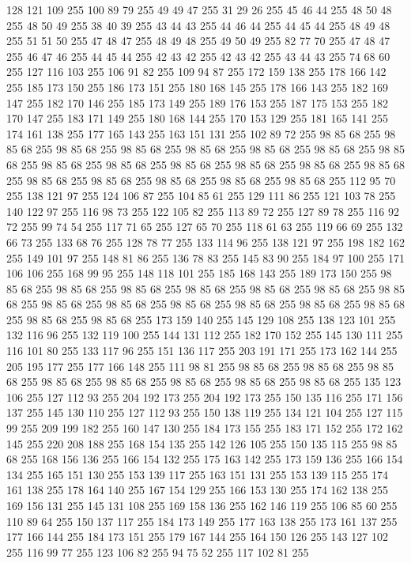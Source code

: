 128 121 109 255 100 89 79 255 49 49 47 255 31 29 26 255 45 46 44 255 48 50 48 255 48 50 49 255 38 40 39 255 43 44 43 255 44 46 44 255 44 45 44 255 48 49 48 255 51 51 50 255 47 48 47 255 48 49 48 255 49 50 49 255 82 77 70 255 47 48 47 255 46 47 46 255 44 45 44 255 42 43 42 255 42 43 42 255 43 44 43 255 74 68 60 255 127 116 103 255 106 91 82 255 109 94 87 255 172 159 138 255 178 166 142 255 185 173 150 255 186 173 151 255 180 168 145 255 178 166 143 255 182 169 147 255 182 170 146 255 185 173 149 255 189 176 153 255 187 175 153 255 182 170 147 255 183 171 149 255 180 168 144 255 170 153 129 255 181 165 141 255 174 161 138 255 177 165 143 255 163 151 131 255 102 89 72 255 98 85 68 255 98 85 68 255 98 85 68 255 98 85 68 255 98 85 68 255 98 85 68 255 98 85 68 255 98 85 68 255 98 85 68 255 98 85 68 255 98 85 68 255 98 85 68 255 98 85 68 255 98 85 68 255 98 85 68 255 98 85 68 255 98 85 68 255
98 85 68 255 98 85 68 255 112 95 70 255 138 121 97 255 124 106 87 255 104 85 61 255 129 111 86 255 121 103 78 255 140 122 97 255 116 98 73 255 122 105 82 255 113 89 72 255 127 89 78 255 116 92 72 255 99 74 54 255 117 71 65 255 127 65 70 255 118 61 63 255 119 66 69 255 132 66 73 255 133 68 76 255 128 78 77 255 133 114 96 255 138 121 97 255 198 182 162 255 149 101 97 255 148 81 86 255 136 78 83 255 145 83 90 255 184 97 100 255 171 106 106 255 168 99 95 255 148 118 101 255 185 168 143 255 189 173 150 255 98 85 68 255 98 85 68 255 98 85 68 255 98 85 68 255 98 85 68 255 98 85 68 255 98 85 68 255 98 85 68 255 98 85 68 255 98 85 68 255 98 85 68 255 98 85 68 255 98 85 68 255 98 85 68 255 98 85 68 255 173 159 140 255 145 129 108 255 138 123 101 255 132 116 96 255 132 119 100 255 144 131 112 255 182 170 152 255 145 130 111 255 116 101 80 255 133 117 96 255 151 136 117 255 203 191 171 255 173 162 144 255 205 195 177 255
177 166 148 255 111 98 81 255 98 85 68 255 98 85 68 255 98 85 68 255 98 85 68 255 98 85 68 255 98 85 68 255 98 85 68 255 98 85 68 255 135 123 106 255 127 112 93 255 204 192 173 255 204 192 173 255 150 135 116 255 171 156 137 255 145 130 110 255 127 112 93 255 150 138 119 255 134 121 104 255 127 115 99 255 209 199 182 255 160 147 130 255 184 173 155 255 183 171 152 255 172 162 145 255 220 208 188 255 168 154 135 255 142 126 105 255 150 135 115 255 98 85 68 255 168 156 136 255 166 154 132 255 175 163 142 255 173 159 136 255 166 154 134 255 165 151 130 255 153 139 117 255 163 151 131 255 153 139 115 255 174 161 138 255 178 164 140 255 167 154 129 255 166 153 130 255 174 162 138 255 169 156 131 255 145 131 108 255 169 158 136 255 162 146 119 255 106 85 60 255 110 89 64 255 150 137 117 255 184 173 149 255 177 163 138 255 173 161 137 255 177 166 144 255 184 173 151 255 179 167 144 255 164 150 126 255 143 127 102 255 116 99 77 255 123 106 82 255 94 75 52 255 117 102 81 255
